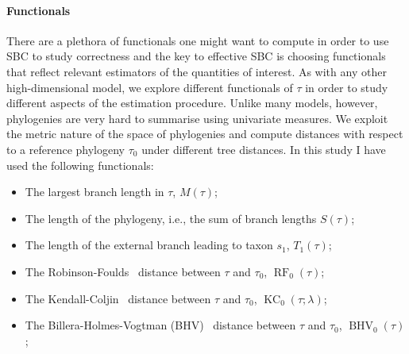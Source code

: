 \documentclass[oneside]{article}
\begin{document}

\paragraph{Functionals}

There are a plethora of functionals one might want to compute in order to use SBC to study correctness and the key to effective SBC is choosing functionals that reflect relevant estimators of the quantities of interest.
As with any other high-dimensional model, we explore different functionals of $\tau$ in order to study different aspects of the estimation procedure.
Unlike many models, however, phylogenies are very hard to summarise using univariate measures.
We exploit the metric nature of the space of phylogenies and compute distances with respect to a reference phylogeny $\tau_0$ under different tree distances.
In this study I have used the following functionals:
\begin{itemize}
 \item The largest branch length in $\tau$, $M(\tau)$;
 \item The length of the phylogeny, i.e.,  the sum of branch lengths $S(\tau)$;
 \item The length of the external branch leading to taxon $s_1$, $T_1(\tau)$;
 \item The Robinson-Foulds~\citep{Robinson1981} distance between $\tau$ and $\tau_0$, $\operatorname{RF}_0(\tau)$;
  \item The Kendall-Coljin~\citep{Kendall2016} distance between $\tau$ and $\tau_0$, $\operatorname{KC}_0(\tau;\lambda)$; 
 \item The Billera-Holmes-Vogtman (BHV)~\citep{Billera2001} distance between $\tau$ and $\tau_0$, $\operatorname{BHV}_0(\tau)$;
\end{itemize}
\end{document}

